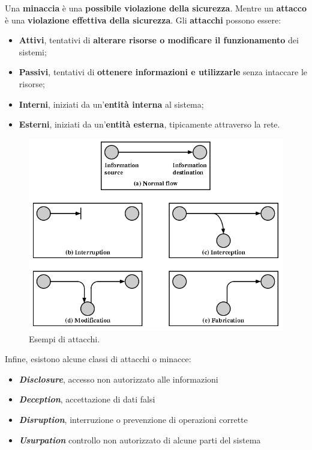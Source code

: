 \documentclass[a4paper]{article}
\begin{document}
	\noindent
	Una \textcolor{Red3}{\textbf{minaccia}} è una \textbf{possibile violazione della sicurezza}. Mentre un \textcolor{Red3}{\textbf{attacco}} è una \textbf{violazione effettiva della sicurezza}. Gli \textbf{attacchi} possono essere:
	\begin{itemize}
		\item \textbf{Attivi}, tentativi di \textbf{alterare risorse o modificare il funzionamento} dei sistemi;
		
		\item \textbf{Passivi}, tentativi di \textbf{ottenere informazioni e utilizzarle} senza intaccare le risorse;
		
		\item \textbf{Interni}, iniziati da un'\textbf{entità interna} al sistema;
		
		\item \textbf{Esterni}, iniziati da un'\textbf{entità esterna}, tipicamente attraverso la rete.
	\end{itemize}\newpage
	
	\begin{figure}[!htp]
		\centering
		\includegraphics[width=\textwidth]{img/sicurezza/sicurezza.png}
		\caption{Esempi di attacchi.}
	\end{figure}

	\noindent
	Infine, esistono alcune classi di attacchi o minacce:
	\begin{itemize}
		\item \textbf{\emph{Disclosure}}, accesso non autorizzato alle informazioni
		
		\item \textbf{\emph{Deception}}, accettazione di dati falsi
		
		\item \textbf{\emph{Disruption}}, interruzione o prevenzione di operazioni corrette
		
		\item \textbf{\emph{Usurpation}} controllo non autorizzato di alcune parti del sistema
	\end{itemize}\newpage
\end{document}
